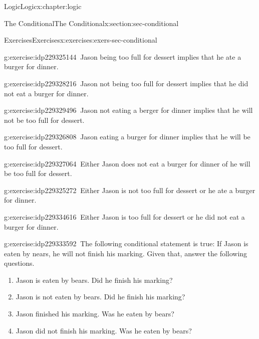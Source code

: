 \documentclass[twoside,10pt,]{book}
\numberwithin{equation}{section}
\begin{document}
\begin{chapterptx}{Logic}{}{Logic}{}{}{x:chapter:logic}
\begin{sectionptx}{The Conditional}{}{The Conditional}{}{}{x:section:sec-conditional}
\begin{exercises-subsection}{Exercises}{}{Exercises}{}{}{x:exercises:exers-sec-conditional}
\begin{exercisegroup}
\begin{divisionexerciseeg}{12}{}{}{g:exercise:idp229325144}
\(\ \)Jason being too full for dessert implies that he ate a burger for dinner.\end{divisionexerciseeg}%
\begin{divisionexerciseeg}{13}{}{}{g:exercise:idp229328216}%
\(\ \)Jason not being too full for dessert implies that he did not eat a burger for dinner.\end{divisionexerciseeg}%
\begin{divisionexerciseeg}{14}{}{}{g:exercise:idp229329496}%
\(\ \)Jason not eating a berger for dinner implies that he will not be too full for dessert.\end{divisionexerciseeg}%
\begin{divisionexerciseeg}{15}{}{}{g:exercise:idp229326808}%
\(\ \)Jason eating a burger for dinner implies that he will be too full for dessert.\end{divisionexerciseeg}%
\begin{divisionexerciseeg}{16}{}{}{g:exercise:idp229327064}%
\(\ \)Either Jason does not eat a burger for dinner of he will be too full for dessert.\end{divisionexerciseeg}%
\begin{divisionexerciseeg}{17}{}{}{g:exercise:idp229325272}%
\(\ \)Either Jason is not too full for dessert or he ate a burger for dinner.\end{divisionexerciseeg}%
\begin{divisionexerciseeg}{18}{}{}{g:exercise:idp229334616}%
\(\ \)Either Jason is too full for dessert or he did not eat a burger for dinner.\end{divisionexerciseeg}%
\end{exercisegroup}
\par\medskip\noindent
\begin{divisionexercise}{19}{}{}{g:exercise:idp229333592}%
\(\ \)The following conditional statement is true: If Jason is eaten by nears, he will not finish his marking.  Given that, answer the following questions. %
\begin{enumerate}[label=(\alph*)]
\item{}Jason is eaten by bears.  Did he finish his marking?%
\item{}Jason is not eaten by bears.  Did he finish his marking?%
\item{}Jason finished his marking.  Was he eaten by bears?%
\item{}Jason did not finish his marking.  Was he eaten by bears?%
\end{enumerate}
\end{divisionexercise}%

\end{exercises-subsection}
\end{sectionptx}
\end{chapterptx}
\end{document}
